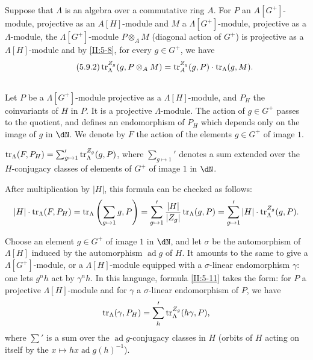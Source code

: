 Suppose that $\Lambda$ is an algebra over a commutative ring $A$. For
$P$ an $A[G^+]$-module, projective as an $A[H]$-module and $M$ a
$\Lambda[G^+]$-module, projective as a $\Lambda$-module, the
$\Lambda[G^+]$-module $P\otimes_A M$ (diagonal action of $G^+$) is projective
as a $\Lambda[H]$-module and by \ref{II:5-8}, for every
$g\in G^+$, we have
\begin{equation*}\tag{5.9.2}\label{II:eq:5-9-2}
  \operatorname{tr}_\Lambda^{Z_g}(g,P\otimes_A M) = \operatorname{tr}_A^{Z_g}(g,P) \cdot \operatorname{tr}_\Lambda(g,M) \text{.}
\end{equation*}




\subsection{}\label{II:5-10}

Let $P$ be a $\Lambda[G^+]$-module projective as a $\Lambda[H]$-module,
and $P_H$ the coinvariants of $H$ in $P$. It is a projective $\Lambda$-module.
The action of $g\in G^+$ passes to the quotient, and defines an endomorphism of
$P_H$ which depends only on the image of $g$ in $\dN$. We denote by $F$
the action of the elements $g\in G^+$ of image $1$.




\begin{proposition_}\label{II:5-11}
$\operatorname{tr}_\Lambda(F,P_H) = \sum_{g\mapsto 1}' \operatorname{tr}_\Lambda^{Z_g}(g,P)$, where
$\sum_{g\mapsto 1}'$ denotes a sum extended over the
$H$-conjugacy classes of elements of $G^+$ of image $1$ in $\dN$.
\end{proposition_}

After multiplication by $|H|$, this formula can be checked as follows:
\[
  |H|\cdot \operatorname{tr}_\Lambda(F,P_H)
    = \operatorname{tr}_\Lambda\left(\sum_{g\mapsto 1} g,P\right)
    = \sum_{g\mapsto 1}' \frac{|H|}{|Z_g|}\operatorname{tr}_\Lambda(g,P)
    = \sum_{g\mapsto 1}' |H|\cdot \operatorname{tr}_\Lambda^{Z_g}(g,P) \text{.}
\]

Choose an element $g\in G^+$ of image $1$ in $\dN$, and let
$\sigma$ be the automorphism of $\Lambda[H]$ induced by the automorphism
$\operatorname{ad} g$ of $H$. It amounts to the same to give a
$\Lambda[G^+]$-module, or a $\Lambda[H]$-module equipped with a
$\sigma$-linear endomorphism $\gamma$: one lets $g^n h$ act by $\gamma^n h$. In this
language, formula \ref{II:5-11} takes the form: for $P$ a
projective $\Lambda[H]$-module and for $\gamma$ a
$\sigma$-linear endomorphism of $P$, we have
\[
  \operatorname{tr}_\Lambda(\gamma,P_H) = \sum_h' \operatorname{tr}_\Lambda^{Z_g}(h\gamma,P)\text{,}
\]
where $\sum'$ is a sum over the $\operatorname{ad}g$-conjugacy classes
in $H$ (orbits of $H$ acting on itself by the
$x\mapsto h x \operatorname{ad} g(h)^{-1}$).

